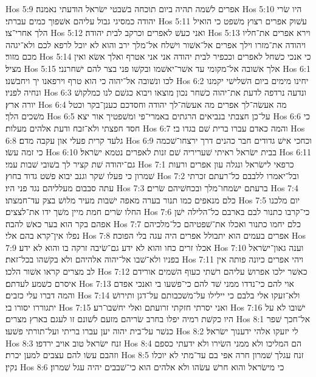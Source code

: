 Hos 5:9  אפרים לשׁמה תהיה ביום תוכחה בשׁבטי ישׂראל הודעתי נאמנה׃
Hos 5:10  היו שׂרי יהודה כמסיגי גבול עליהם אשׁפוך כמים עברתי׃
Hos 5:11  עשׁוק אפרים רצוץ משׁפט כי הואיל הלך אחרי־צו׃
Hos 5:12  ואני כעשׁ לאפרים וכרקב לבית יהודה׃
Hos 5:13  וירא אפרים את־חליו ויהודה את־מזרו וילך אפרים אל־אשׁור וישׁלח אל־מלך ירב והוא לא יוכל לרפא לכם ולא־יגהה מכם מזור׃
Hos 5:14  כי אנכי כשׁחל לאפרים וככפיר לבית יהודה אני אני אטרף ואלך אשׂא ואין מציל׃
Hos 5:15  אלך אשׁובה אל־מקומי עד אשׁר־יאשׁמו ובקשׁו פני בצר להם ישׁחרנני׃
Hos 6:1  לכו ונשׁובה אל־יהוה כי הוא טרף וירפאנו יך ויחבשׁנו׃
Hos 6:2  יחינו מימים ביום השׁלישׁי יקמנו ונחיה לפניו׃
Hos 6:3  ונדעה נרדפה לדעת את־יהוה כשׁחר נכון מוצאו ויבוא כגשׁם לנו כמלקושׁ יורה ארץ׃
Hos 6:4  מה אעשׂה־לך אפרים מה אעשׂה־לך יהודה וחסדכם כענן־בקר וכטל משׁכים הלך׃
Hos 6:5  על־כן חצבתי בנביאים הרגתים באמרי־פי ומשׁפטיך אור יצא׃
Hos 6:6  כי חסד חפצתי ולא־זבח ודעת אלהים מעלות׃
Hos 6:7  והמה כאדם עברו ברית שׁם בגדו בי׃
Hos 6:8  גלעד קרית פעלי און עקבה מדם׃
Hos 6:9  וכחכי אישׁ גדודים חבר כהנים דרך ירצחו־שׁכמה כי זמה עשׂו׃
Hos 6:10  בבית ישׂראל ראיתי שׁעריריה שׁם זנות לאפרים נטמא ישׂראל׃
Hos 6:11  גם־יהודה שׁת קציר לך בשׁובי שׁבות עמי׃
Hos 7:1  כרפאי לישׂראל ונגלה עון אפרים ורעות שׁמרון כי פעלו שׁקר וגנב יבוא פשׁט גדוד בחוץ׃
Hos 7:2  ובל־יאמרו ללבבם כל־רעתם זכרתי עתה סבבום מעלליהם נגד פני היו׃
Hos 7:3  ברעתם ישׂמחו־מלך ובכחשׁיהם שׂרים׃
Hos 7:4  כלם מנאפים כמו תנור בערה מאפה ישׁבות מעיר מלושׁ בצק עד־חמצתו׃
Hos 7:5  יום מלכנו החלו שׂרים חמת מיין משׁך ידו את־לצצים׃
Hos 7:6  כי־קרבו כתנור לבם בארבם כל־הלילה ישׁן אפהם בקר הוא בער כאשׁ להבה׃
Hos 7:7  כלם יחמו כתנור ואכלו את־שׁפטיהם כל־מלכיהם נפלו אין־קרא בהם אלי׃
Hos 7:8  אפרים בעמים הוא יתבולל אפרים היה עגה בלי הפוכה׃
Hos 7:9  אכלו זרים כחו והוא לא ידע גם־שׂיבה זרקה בו והוא לא ידע׃
Hos 7:10  וענה גאון־ישׂראל בפניו ולא־שׁבו אל־יהוה אלהיהם ולא בקשׁהו בכל־זאת׃
Hos 7:11  ויהי אפרים כיונה פותה אין לב מצרים קראו אשׁור הלכו׃
Hos 7:12  כאשׁר ילכו אפרושׂ עליהם רשׁתי כעוף השׁמים אורידם איסרם כשׁמע לעדתם׃
Hos 7:13  אוי להם כי־נדדו ממני שׁד להם כי־פשׁעו בי ואנכי אפדם והמה דברו עלי כזבים׃
Hos 7:14  ולא־זעקו אלי בלבם כי יילילו על־משׁכבותם על־דגן ותירושׁ יתגוררו יסורו בי׃
Hos 7:15  ואני יסרתי חזקתי זרועתם ואלי יחשׁבו־רע׃
Hos 7:16  ישׁובו לא על היו כקשׁת רמיה יפלו בחרב שׂריהם מזעם לשׁונם זו לעגם בארץ מצרים׃
Hos 8:1  אל־חכך שׁפר כנשׁר על־בית יהוה יען עברו בריתי ועל־תורתי פשׁעו׃
Hos 8:2  לי יזעקו אלהי ידענוך ישׂראל׃
Hos 8:3  זנח ישׂראל טוב אויב ירדפו׃
Hos 8:4  הם המליכו ולא ממני השׂירו ולא ידעתי כספם וזהבם עשׂו להם עצבים למען יכרת׃
Hos 8:5  זנח עגלך שׁמרון חרה אפי בם עד־מתי לא יוכלו נקין׃
Hos 8:6  כי מישׂראל והוא חרשׁ עשׂהו ולא אלהים הוא כי־שׁבבים יהיה עגל שׁמרון׃
